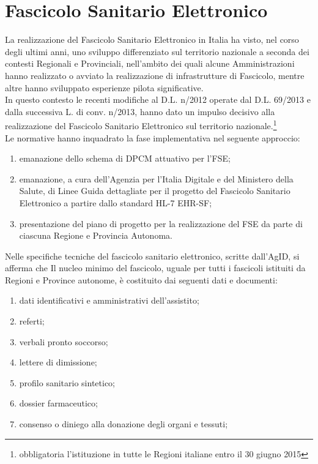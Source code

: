 \section{Fascicolo Sanitario Elettronico}
La realizzazione del Fascicolo Sanitario Elettronico in Italia ha visto, nel corso degli ultimi anni, uno sviluppo differenziato sul territorio nazionale a seconda dei contesti Regionali e Provinciali, nell'ambito dei quali alcune Amministrazioni hanno realizzato o avviato la realizzazione di infrastrutture di Fascicolo, mentre altre hanno sviluppato esperienze pilota significative. \\ 
In questo contesto le recenti modifiche al D.L. n/2012 operate dal D.L. 69/2013\autocite{decretofare} e dalla successiva L. di conv. n/2013, hanno dato un impulso decisivo alla realizzazione del Fascicolo Sanitario Elettronico sul territorio nazionale.\footnote{obbligatoria l'istituzione in tutte le Regioni italiane entro il 30 giugno 2015} \\
Le normative hanno inquadrato la fase implementativa nel seguente approccio:
\begin{enumerate}
	\item emanazione dello schema di DPCM attuativo per l'FSE;\cite{dpcmfse}
	\item emanazione, a cura dell’Agenzia per l’Italia Digitale e del Ministero della Salute, di Linee Guida dettagliate per il progetto del Fascicolo Sanitario Elettronico a partire dallo standard HL-7 \gls{EHR-SF};
	\item  presentazione del piano di progetto per la realizzazione del FSE da parte di ciascuna Regione e Provincia Autonoma.
\end{enumerate}
Nelle specifiche tecniche del fascicolo sanitario elettronico, scritte dall'AgID, si afferma che Il nucleo minimo del fascicolo, uguale per tutti i fascicoli istituiti da Regioni e Province autonome, è costituito dai seguenti dati e documenti:
\begin{enumerate}
	\item dati identificativi e amministrativi dell’assistito;
	\item referti;
	\item verbali pronto soccorso;
	\item lettere di dimissione;
	\item profilo sanitario sintetico;
	\item dossier farmaceutico;
	\item consenso o diniego alla donazione degli organi e tessuti;
\end{enumerate}
